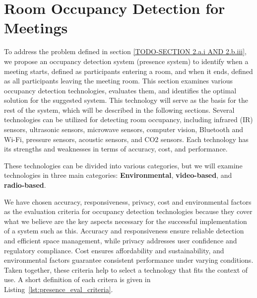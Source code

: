 \chapter{\label{sec:presence_intro}Room Occupancy Detection for Meetings}

To address the problem defined in section \ref{TODO-SECTION 2.a.i AND 2.b.iii}, we propose an occupancy detection system (presence system) to identify when a meeting starts, defined as participants entering a room, and when it ends, defined as all participants leaving the meeting room.
This section examines various occupancy detection technologies, evaluates them, and identifies the optimal solution for the suggested system.
This technology will serve as the basis for the rest of the system, which will be described in the following sections.
Several technologies can be utilized for detecting room occupancy, including infrared (IR) sensors\cite{woodward-2021, dodierBuildingOccupancyDetection2006, OccupancySensorMotion}, ultrasonic sensors\cite{woodward-2021, dodierBuildingOccupancyDetection2006, OccupancySensorMotion}, microwave sensors\cite{woodward-2021}, computer vision\cite{co2sensor, longoAccurateOccupancyEstimation2019, OccupancySensorMotion}, Bluetooth and Wi-Fi\cite{teissedre-2019}, pressure sensors\cite{OccupancySensorMotion}, acoustic sensors\cite{OccupancySensorMotion}, and CO2 sensors\cite{co2sensor, longoAccurateOccupancyEstimation2019, jinSensingProxyOccupancy2015}.\cite{faragherLocationFingerprintingBluetooth2015}
Each technology has its strengths and weaknesses in terms of accuracy, cost, and performance.

These technologies can be divided into various categories, but we will examine technologies in three main categories: \textbf{Environmental}, \textbf{video-based}, and \textbf{radio-based}.

We have chosen accuracy, responsiveness, privacy, cost and environmental factors as the evaluation criteria for occupancy detection technologies because they cover what we believe are the key aspects necessary for the successful implementation of a system such as this.
Accuracy and responsiveness ensure reliable detection and efficient space management, while privacy addresses user confidence and regulatory compliance.
Cost ensures affordability and sustainability, and environmental factors guarantee consistent performance under varying conditions.
Taken together, these criteria help to select a technology that fits the context of use.
A short definition of each critera is given in Listing~\ref{lst:presence_eval_criteria}.

